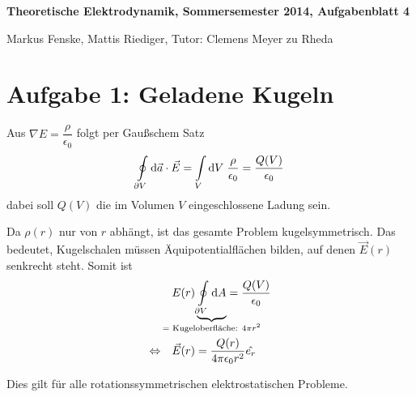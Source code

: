 \documentclass[a4paper,german,12pt,smallheadings]{scrartcl}
\begin{document}
\allowdisplaybreaks %
\begin{center}
\bfseries %
\sffamily %
\vspace{-40pt}
Theoretische Elektrodynamik, Sommersemester 2014, Aufgabenblatt 4

Markus Fenske, Mattis Riediger, Tutor: Clemens Meyer zu Rheda
\vspace{-10pt}
\end{center}

\section*{Aufgabe 1: Geladene Kugeln}
Aus $\nabla E = \dfrac{\rho}{\epsilon_0}$ folgt per Gaußschem Satz
\begin{equation}
  \oint\limits_{\partial V} \dif \vec{a} \cdot \vec{E} = \int\limits_{V} \dif V \; \frac{\rho}{\epsilon_0} = \frac{Q(V)}{\epsilon_0}
\end{equation}
dabei soll $Q(V)$ die im Volumen $V$ eingeschlossene Ladung sein.

Da $\rho(r)$ nur von $r$ abhängt, ist das gesamte Problem kugelsymmetrisch.
Das bedeutet, Kugelschalen müssen Äquipotentialflächen bilden, auf denen
$\vec{E}(r)$ senkrecht steht. Somit ist
\begin{align}
  &E(r) \underbrace{\oint\limits_{\partial V} \dif A}_{\mathclap{= \text{ Kugeloberfläche: } 4 \pi r^2}} = \frac{Q(V)}{\epsilon_0} \\
  \Leftrightarrow\quad
  & \vec{E}(r) = \frac{Q(r)}{4 \pi \epsilon_0 r^2} \hat{e_r}
\end{align}

Dies gilt für alle rotationssymmetrischen elektrostatischen Probleme.
\end{document}

